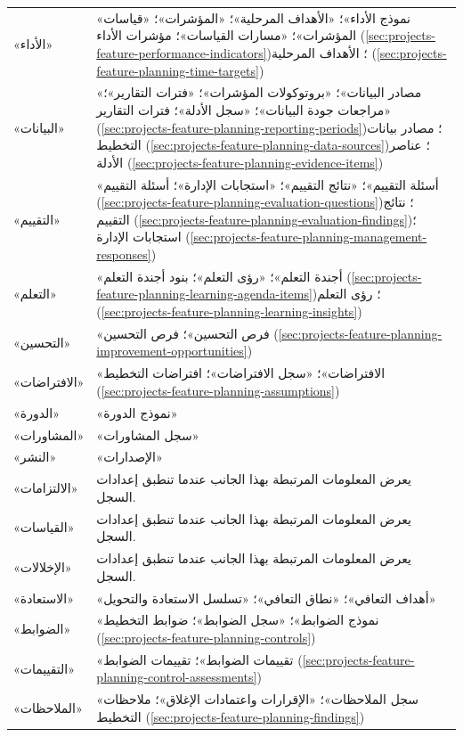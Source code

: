 \begin{table}[H]
\begin{tabularx}{\linewidth}{R{4.2cm} Y}
«الأداء» & «نموذج الأداء»؛ «الأهداف المرحلية»؛ «المؤشرات»؛ «قياسات المؤشرات»؛ «مسارات القياسات»؛ مؤشرات الأداء (\ref{sec:projects-feature-performance-indicators})؛ الأهداف المرحلية (\ref{sec:projects-feature-planning-time-targets})\\
«البيانات» & «مصادر البيانات»؛ «بروتوكولات المؤشرات»؛ «فترات التقارير»؛ «مراجعات جودة البيانات»؛ «سجل الأدلة»؛ فترات التقارير (\ref{sec:projects-feature-planning-reporting-periods})؛ مصادر بيانات التخطيط (\ref{sec:projects-feature-planning-data-sources})؛ عناصر الأدلة (\ref{sec:projects-feature-planning-evidence-items})\\
«التقييم» & «أسئلة التقييم»؛ «نتائج التقييم»؛ «استجابات الإدارة»؛ أسئلة التقييم (\ref{sec:projects-feature-planning-evaluation-questions})؛ نتائج التقييم (\ref{sec:projects-feature-planning-evaluation-findings})؛ استجابات الإدارة (\ref{sec:projects-feature-planning-management-responses})\\
«التعلم» & «أجندة التعلم»؛ «رؤى التعلم»؛ بنود أجندة التعلم (\ref{sec:projects-feature-planning-learning-agenda-items})؛ رؤى التعلم (\ref{sec:projects-feature-planning-learning-insights})\\
«التحسين» & «فرص التحسين»؛ فرص التحسين (\ref{sec:projects-feature-planning-improvement-opportunities})\\
«الافتراضات» & «الافتراضات»؛ «سجل الافتراضات»؛ افتراضات التخطيط (\ref{sec:projects-feature-planning-assumptions})\\
«الدورة» & «نموذج الدورة»\\
«المشاورات» & «سجل المشاورات»\\
«النشر» & «الإصدارات»\\
«الالتزامات» & يعرض المعلومات المرتبطة بهذا الجانب عندما تنطبق إعدادات السجل.\\
«القياسات» & يعرض المعلومات المرتبطة بهذا الجانب عندما تنطبق إعدادات السجل.\\
«الإخلالات» & يعرض المعلومات المرتبطة بهذا الجانب عندما تنطبق إعدادات السجل.\\
«الاستعادة» & «أهداف التعافي»؛ «نطاق التعافي»؛ «تسلسل الاستعادة والتحويل»\\
«الضوابط» & «نموذج الضوابط»؛ «سجل الضوابط»؛ ضوابط التخطيط (\ref{sec:projects-feature-planning-controls})\\
«التقييمات» & «تقييمات الضوابط»؛ تقييمات الضوابط (\ref{sec:projects-feature-planning-control-assessments})\\
«الملاحظات» & «سجل الملاحظات»؛ «الإقرارات واعتمادات الإغلاق»؛ ملاحظات التخطيط (\ref{sec:projects-feature-planning-findings})\\

\end{tabularx}
\end{table}
